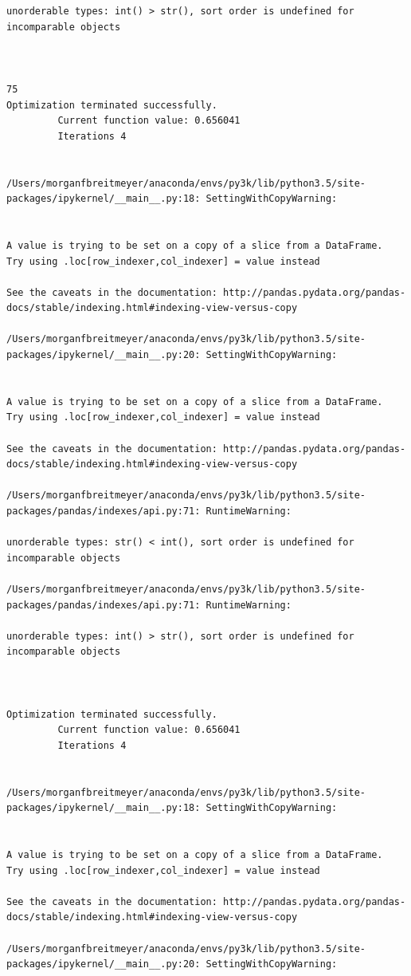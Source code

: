 \begin{lstlisting}
unorderable types: int() > str(), sort order is undefined for incomparable objects



75
Optimization terminated successfully.
         Current function value: 0.656041
         Iterations 4


/Users/morganfbreitmeyer/anaconda/envs/py3k/lib/python3.5/site-packages/ipykernel/__main__.py:18: SettingWithCopyWarning:


A value is trying to be set on a copy of a slice from a DataFrame.
Try using .loc[row_indexer,col_indexer] = value instead

See the caveats in the documentation: http://pandas.pydata.org/pandas-docs/stable/indexing.html#indexing-view-versus-copy

/Users/morganfbreitmeyer/anaconda/envs/py3k/lib/python3.5/site-packages/ipykernel/__main__.py:20: SettingWithCopyWarning:


A value is trying to be set on a copy of a slice from a DataFrame.
Try using .loc[row_indexer,col_indexer] = value instead

See the caveats in the documentation: http://pandas.pydata.org/pandas-docs/stable/indexing.html#indexing-view-versus-copy

/Users/morganfbreitmeyer/anaconda/envs/py3k/lib/python3.5/site-packages/pandas/indexes/api.py:71: RuntimeWarning:

unorderable types: str() < int(), sort order is undefined for incomparable objects

/Users/morganfbreitmeyer/anaconda/envs/py3k/lib/python3.5/site-packages/pandas/indexes/api.py:71: RuntimeWarning:

unorderable types: int() > str(), sort order is undefined for incomparable objects



Optimization terminated successfully.
         Current function value: 0.656041
         Iterations 4


/Users/morganfbreitmeyer/anaconda/envs/py3k/lib/python3.5/site-packages/ipykernel/__main__.py:18: SettingWithCopyWarning:


A value is trying to be set on a copy of a slice from a DataFrame.
Try using .loc[row_indexer,col_indexer] = value instead

See the caveats in the documentation: http://pandas.pydata.org/pandas-docs/stable/indexing.html#indexing-view-versus-copy

/Users/morganfbreitmeyer/anaconda/envs/py3k/lib/python3.5/site-packages/ipykernel/__main__.py:20: SettingWithCopyWarning:



\end{lstlisting}
